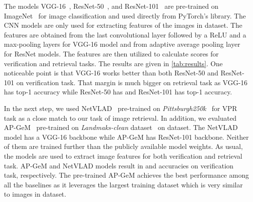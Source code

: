 \documentclass[a4paper,conference]{IEEEtran}
\begin{document}
The models VGG-16~\cite{simonyan2014very}, ResNet-50~\cite{he2016deep}, and ResNet-101~\cite{arandjelovic2016netvlad} are pre-trained on ImageNet~\cite{deng2009imagenet} for image classification and used directly from PyTorch's library. The CNN models are only used for extracting features of the images in \amstertime dataset. The features are obtained from the last convolutional layer followed by a ReLU and a max-pooling layers for VGG-16 model and from adaptive average pooling layer for ResNet models. The features are then utilized to calculate scores for verification and retrieval tasks. The results are given in \cref{tab:results}. One noticeable point is that VGG-16 works better than both ResNet-50 and ResNet-101 on verification task. That margin is much bigger on retrieval task as VGG-16 has  top-1 accuracy while ResNet-50 has  and ResNet-101 has  top-1 accuracy.

In the next step, we used  NetVLAD~\cite{arandjelovic2016netvlad} pre-trained on \textit{Pittsburgh250k}~\cite{Torii2013} for VPR task as a close match to our task of image retrieval. In addition, we evaluated  AP-GeM~\cite{revaud2019apgem}  pre-trained on \textit{Landmaks-clean} dataset~\cite{gordo2016deep} on \amstertime dataset. The NetVLAD model has a VGG-16 backbone while AP-GeM has ResNet-101 backbone. Neither of them are trained further than the publicly available model weights. As usual, the models are used to extract image features for both verification and retrieval task. AP-GeM and NetVLAD models result in  and   accuracies on verification task, respectively. The pre-trained AP-GeM achieves the best performance among all the baselines as it leverages the largest training dataset which is very similar to images in \amstertime dataset.
\end{document}
